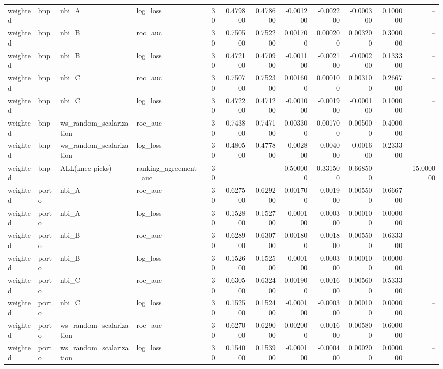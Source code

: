 \begin{landscape}
\begin{longtable}{llllrrrrrrrr}
weighted & bnp & nbi\_A & log\_loss & 30 & 0.479800 & 0.478600 & -0.001200 & -0.002200 & -0.000300 & 0.100000 & -- \\
weighted & bnp & nbi\_B & roc\_auc & 30 & 0.750500 & 0.752200 & 0.001700 & 0.000200 & 0.003200 & 0.300000 & -- \\
weighted & bnp & nbi\_B & log\_loss & 30 & 0.472100 & 0.470900 & -0.001100 & -0.002100 & -0.000200 & 0.133300 & -- \\
weighted & bnp & nbi\_C & roc\_auc & 30 & 0.750700 & 0.752300 & 0.001600 & 0.000100 & 0.003100 & 0.266700 & -- \\
weighted & bnp & nbi\_C & log\_loss & 30 & 0.472200 & 0.471200 & -0.001000 & -0.001900 & -0.000100 & 0.100000 & -- \\
weighted & bnp & ws\_random\_scalarization & roc\_auc & 30 & 0.743800 & 0.747100 & 0.003300 & 0.001700 & 0.005000 & 0.400000 & -- \\
weighted & bnp & ws\_random\_scalarization & log\_loss & 30 & 0.480500 & 0.477800 & -0.002800 & -0.004000 & -0.001600 & 0.233300 & -- \\
weighted & bnp & ALL(knee picks) & ranking\_agreement\_auc & 30 & -- & -- & 0.500000 & 0.331500 & 0.668500 & -- & 15.000000 \\
weighted & porto & nbi\_A & roc\_auc & 30 & 0.627500 & 0.629200 & 0.001700 & -0.001900 & 0.005500 & 0.666700 & -- \\
weighted & porto & nbi\_A & log\_loss & 30 & 0.152800 & 0.152700 & -0.000100 & -0.000300 & 0.000100 & 0.000000 & -- \\
weighted & porto & nbi\_B & roc\_auc & 30 & 0.628900 & 0.630700 & 0.001800 & -0.001800 & 0.005500 & 0.633300 & -- \\
weighted & porto & nbi\_B & log\_loss & 30 & 0.152600 & 0.152500 & -0.000100 & -0.000300 & 0.000100 & 0.000000 & -- \\
weighted & porto & nbi\_C & roc\_auc & 30 & 0.630500 & 0.632400 & 0.001900 & -0.001600 & 0.005600 & 0.533300 & -- \\
weighted & porto & nbi\_C & log\_loss & 30 & 0.152500 & 0.152400 & -0.000100 & -0.000300 & 0.000100 & 0.000000 & -- \\
weighted & porto & ws\_random\_scalarization & roc\_auc & 30 & 0.627000 & 0.629000 & 0.002000 & -0.001600 & 0.005800 & 0.600000 & -- \\
weighted & porto & ws\_random\_scalarization & log\_loss & 30 & 0.154000 & 0.153900 & -0.000100 & -0.000400 & 0.000200 & 0.000000 & -- \\

\end{longtable}
\end{landscape}
